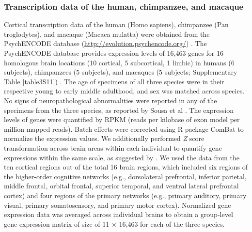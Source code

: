 \begin{refsection}
\subsubsection*{Transcription data of the human, chimpanzee, and macaque}
Cortical transcription data of the human (Homo sapiens), chimpanzee (Pan troglodytes), and macaque (Macaca mulatta) were obtained from the PsychENCODE database (\url{http://evolution.psychencode.org/}) \citep{sousa2017molecular}. The PsychENCODE database provides expression levels of 16,463 genes for 16 homologous brain locations (10 cortical, 5 subcortical, 1 limbic) in humans (6 subjects), chimpanzees (5 subjects), and macaques (5 subjects; Supplementary Table \ref{table3S11}) \citep{sousa2017molecular}. The age of specimens of all three species were in their respective young to early middle adulthood, and sex was matched across species. No signs of neuropathological abnormalities were reported in any of the specimens from the three species, as reported by Sousa et al \citep{sousa2017molecular}. The expression levels of genes were quantified by RPKM (reads per kilobase of exon model per million mapped reads). Batch effects were corrected using R package ComBat \citep{Team2014RAL} to normalize the expression values. We additionally performed \textit{Z} score transformation across brain areas within each individual to quantify gene expressions within the same scale, as suggested by \citep{Arnatkeviciute2018APG}. We used the data from the ten cortical regions out of the total 16 brain regions, which included six regions of the higher-order cognitive networks (e.g., dorsolateral prefrontal, inferior parietal, middle frontal, orbital frontal, superior temporal, and ventral lateral prefrontal cortex) and four regions of the primary networks (e.g., primary auditory, primary visual, primary somatosensory, and primary motor cortex). Normalized gene expression data was averaged across individual brains to obtain a group-level gene expression matrix of size of 11 $ \times $  16,463 for each of the three species.


\end{refsection}
